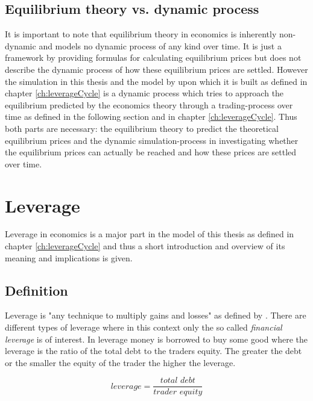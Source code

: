 \documentclass[../Bachelorarbeit.tex]{subfiles}
\begin{document}
\subsection{Equilibrium theory vs. dynamic process}
It is important to note that equilibrium theory in economics is inherently non-dynamic and models no dynamic process of any kind over time. It is just a framework by providing formulas for calculating equilibrium prices but does not describe the dynamic process of how these equilibrium prices are settled. However the simulation in this thesis and the model by \cite{Breuer2015} upon which it is built as defined in chapter \ref{ch:leverageCycle} is a dynamic process which tries to approach the equilibrium predicted by the economics theory through a trading-process over time as defined in the following section and in chapter \ref{ch:leverageCycle}.  Thus both parts are necessary: the equilibrium theory to predict the theoretical equilibrium prices and the dynamic simulation-process in investigating whether the equilibrium prices can actually be reached and how these prices are settled over time.



\section{Leverage}
Leverage in economics is a major part in the model of this thesis as defined in chapter \ref{ch:leverageCycle} and thus a short introduction and overview of its meaning and implications is given.

\subsection{Definition}

Leverage is "any technique to multiply gains and losses" as defined by \cite{Brigham2012}. There are different types of leverage where in this context only the so called \textit{financial leverage} is of interest. In leverage money is borrowed to buy some good where the leverage is the ratio of the total debt to the traders equity. The greater the debt or the smaller the equity of the trader the higher the leverage.

\begin{equation}
leverage = \frac{\textit{total debt}}{\textit{trader equity}}
\end{equation}

\medskip
\end{document}
